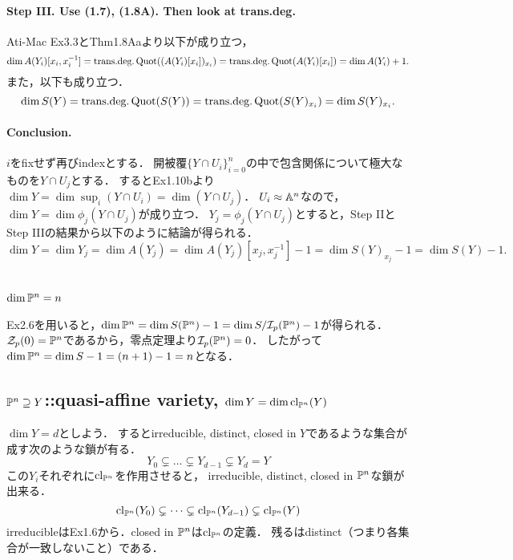 \documentclass[a4paper]{jsarticle}
\newcommand{\transdeg}{\text{trans.deg.}}
\begin{document}
    \paragraph{Step III. Use (1.7), (1.8A). Then look at trans.deg.}
    Ati-Mac Ex3.3とThm1.8Aaより以下が成り立つ，
    \[ \dim A(Y_i)[x_i, x_i^{-1}]=\transdeg \Quot((A(Y_i)[x_i])_{x_i})=\transdeg \Quot(A(Y_i)[x_i])=\dim A(Y_i)+1. \]
    また，以下も成り立つ．
    \[ \dim S(Y)=\transdeg \Quot(S(Y))=\transdeg \Quot(S(Y)_{x_i})=\dim S(Y)_{x_i}. \]

    \paragraph{Conclusion.}
    $i$をfixせず再びindexとする．
    開被覆$\{Y \cap U_i\}_{i=0}^{n}$の中で包含関係について極大なものを$Y \cap U_j$とする．
    するとEx1.10bより$\dim Y=\dim \sup_i (Y \cap U_i)=\dim (Y \cap U_j)$．
    $U_i \approx \mathbb{A}^n$なので，$\dim Y=\dim \phi_j(Y \cap U_j)$が成り立つ．
    $Y_j=\phi_j(Y \cap U_j)$とすると，Step IIとStep IIIの結果から以下のように結論が得られる．
    \[ \dim Y=\dim Y_j=\dim A(Y_j)=\dim A(Y_j)[x_j, x_j^{-1}]-1=\dim S(Y)_{x_j}-1=\dim S(Y)-1. \]

\section{ } %
    \subsection{$\dim \mathbb{P}^n=n$}
    Ex2.6を用いると，$\dim \mathbb{P}^n=\dim S(\mathbb{P}^n)-1=\dim S/\mathcal{I}_p(\mathbb{P}^n)-1$が得られる．
    $\mathcal{Z}_p(0)=\mathbb{P}^n$であるから，零点定理より$\mathcal{I}_p(\mathbb{P}^n)=0$．
    したがって$\dim \mathbb{P}^n=\dim S-1=(n+1)-1=n$となる．

    \subsection{$\mathbb{P}^n \supseteq Y$::quasi-affine variety, $\dim Y=\dim \operatorname{cl}_{\mathbb{P}^n}(Y)$}
    $\dim Y=d$としよう．
    するとirreducible, distinct, closed in $Y$であるような集合が成す次のような鎖が有る．
    \[ Y_0 \subsetneq \dots \subsetneq Y_{d-1} \subsetneq Y_d=Y \]
    この$Y_i$それぞれに$\operatorname{cl}_{\mathbb{P}^n}$を作用させると，
    irreducible, distinct, closed in $\mathbb{P}^n$な鎖が出来る．
    \[ \operatorname{cl}_{\mathbb{P}^n}(Y_0) \subsetneq \dots \subsetneq \operatorname{cl}_{\mathbb{P}^n}(Y_{d-1}) \subsetneq \operatorname{cl}_{\mathbb{P}^n}(Y) \]
    irreducibleはEx1.6から．closed in $\mathbb{P}^n$は$\operatorname{cl}_{\mathbb{P}^n}$の定義．
    残るはdistinct（つまり各集合が一致しないこと）である．
    
\end{document}
